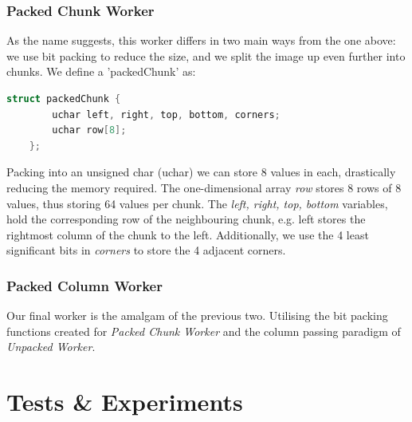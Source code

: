 \documentclass[11pt, oneside]{article}
\begin{document}
\subsubsection{Packed Chunk Worker}
As the name suggests, this worker differs in two main ways from the one above: we use bit packing to reduce the size, and we split the image up even further into chunks. We define a 'packedChunk' as:

    \begin{lstlisting}[language=C]
    struct packedChunk {
    	uchar left, right, top, bottom, corners;
        uchar row[8];
    };
    \end{lstlisting}
    
Packing into an unsigned char (uchar) we can store 8 values in each, drastically reducing the memory required. The one-dimensional array \emph{row} stores 8 rows of 8 values, thus storing 64 values per chunk. The \emph{left, right, top, bottom} variables, hold the corresponding row of the neighbouring chunk, e.g. left stores the rightmost column of the chunk to the left. Additionally, we use the 4 least significant bits in \emph{corners} to store the 4 adjacent corners.

\subsubsection{Packed Column Worker}
Our final worker is the amalgam of the previous two. Utilising the bit packing functions created for \emph{Packed Chunk Worker} and the column passing paradigm of \emph{Unpacked Worker}. 



\pagebreak
\section{Tests \& Experiments}
\end{document}
